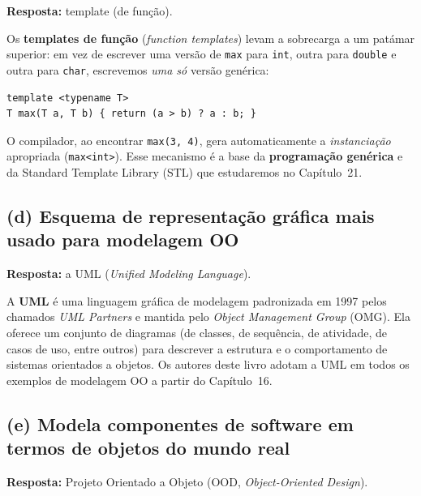 \documentclass[11pt,a4paper]{article}
\begin{document}
\begin{resposta}\textbf{Resposta:} template (de fun\c{c}\~ao).\end{resposta}

Os \textbf{templates de fun\c{c}\~ao} (\emph{function templates}) levam a sobrecarga a um pat\'amar superior: em vez de escrever uma vers\~ao de \texttt{max} para \texttt{int}, outra para \texttt{double} e outra para \texttt{char}, escrevemos \emph{uma s\'o} vers\~ao gen\'erica:

\begin{lstlisting}[style=cppcode,numbers=none]
template <typename T>
T max(T a, T b) { return (a > b) ? a : b; }
\end{lstlisting}

\noindent O compilador, ao encontrar \texttt{max(3, 4)}, gera automaticamente a \emph{instancia\c{c}\~ao} apropriada (\texttt{max<int>}). Esse mecanismo \'e a base da \textbf{programa\c{c}\~ao gen\'erica} e da Standard Template Library (STL) que estudaremos no Cap\'itulo~21.

\subsection*{(d) Esquema de representa\c{c}\~ao gr\'afica mais usado para modelagem OO}

\begin{resposta}\textbf{Resposta:} a UML (\emph{Unified Modeling Language}).\end{resposta}

A \textbf{UML} \'e uma linguagem gr\'afica de modelagem padronizada em 1997 pelos chamados \emph{UML Partners} e mantida pelo \emph{Object Management Group} (OMG). Ela oferece um conjunto de diagramas (de classes, de sequ\^encia, de atividade, de casos de uso, entre outros) para descrever a estrutura e o comportamento de sistemas orientados a objetos. Os autores deste livro adotam a UML em todos os exemplos de modelagem OO a partir do Cap\'itulo~16.

\subsection*{(e) Modela componentes de software em termos de objetos do mundo real}

\begin{resposta}\textbf{Resposta:} Projeto Orientado a Objeto (OOD, \emph{Object-Oriented Design}).\end{resposta}
\end{document}
